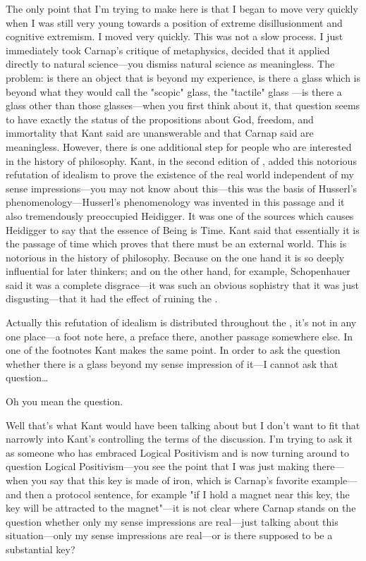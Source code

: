 The only point that I'm trying to make here is that I began to move 
very quickly when I was still very young towards a position of extreme 
disillusionment and cognitive extremism. I moved very quickly. This 
was not a slow process. I just immediately took Carnap's critique of 
metaphysics, decided that it applied directly to natural science---you 
dismiss natural science as meaningless. The problem: is there an object 
that is beyond my experience, is there a glass which is beyond what they 
would call the "scopic" glass, the "tactile" glass ---is there a glass other than 
those glasses---when you first think about it, that question seems to 
have exactly the status of the propositions about God, freedom, and 
immortality that Kant said are unanswerable and that Carnap said are 
meaningless. However, there is one additional step for people who are 
interested in the history of philosophy. Kant, in the second edition of 
, added this notorious refutation of idealism to 
prove the existence of the real world independent of my sense 
impressions---you may not know about this---this was the basis of 
Husserl's phenomenology---Husserl's phenomenology was invented in 
this passage and it also tremendously preoccupied Heidigger. It was 
one of the sources which causes Heidigger to say that the essence of 
Being is Time. Kant said that essentially it is the passage of time which 
proves that there must be an external world. This is notorious in the 
history of philosophy. Because on the one hand it is so deeply 
influential for later thinkers; and on the other hand, for example, 
Schopenhauer said it was a complete disgrace---it was such an obvious sophistry 
that it was just disgusting---that it had the effect of ruining the 
. 

Actually this refutation of idealism is distributed throughout the 
, it's not in any one place---a foot note here, 
a preface there, another passage somewhere else. In one of the footnotes 
Kant makes the same point. In order to ask the question whether 
there is a glass beyond my sense impression of it---I cannot ask that 
question\ldots

 Oh you mean the  question. 

 Well that's what Kant would have been talking about but I 
don't want to fit that narrowly into Kant's controlling the terms of the 
discussion. I'm trying to ask it as someone who has embraced 
Logical Positivism and is now turning around to question Logical 
Positivism---you see the point that I was just making there---when 
you say that this key is made of iron, which is Carnap's favorite 
example---and then a protocol sentence, for example 
"if I hold a magnet near this key, the key will be attracted to the magnet"---it 
is not clear where Carnap stands on 
the question whether only my sense impressions are real---just talking 
about this situation---only my sense impressions are real---or is there 
supposed to be a substantial key? 


